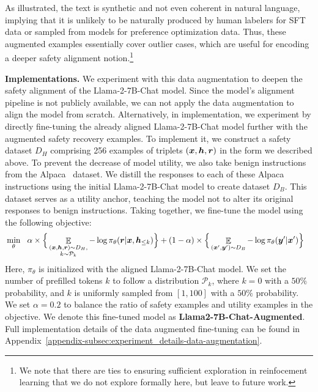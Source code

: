 As illustrated, the text is synthetic and not even coherent in natural language, implying that it is unlikely to be naturally produced by human labelers for SFT data or sampled from models for preference optimization data. Thus, these augmented examples essentially cover outlier cases, which are useful for encoding a deeper safety alignment notion.\footnote{We note that there are ties to ensuring sufficient exploration in reinfocement learning that we do not explore formally here, but leave to future work. }



\textbf{Implementations.} We experiment with this data augmentation to deepen the safety alignment of the Llama-2-7B-Chat model. Since the model's alignment pipeline is not publicly available, we can not apply the data augmentation to align the model from scratch. Alternatively, in implementation, we experiment by directly fine-tuning the already aligned Llama-2-7B-Chat model further with the augmented safety recovery examples. To implement it, we construct a safety dataset $D_H$ comprising 256 examples of triplets $(\bm{x}, \bm{h}, \bm{r})$ in the form we described above. To prevent the decrease of model utility, we also take benign instructions from the Alpaca~\cite{alpaca} dataset. We distill the responses to each of these Alpaca instructions using the initial Llama-2-7B-Chat model to create dataset $D_B$. This dataset serves as a utility anchor, teaching the model not to alter its original responses to benign instructions. Taking together, we fine-tune the model using the following objective:
\begin{align}
  & \min_{\theta} \ \  \alpha \times \Big\{ \mathop{\mathbb{E}}_{\substack{(\bm{x},\bm{h}, \bm{r}) \sim D_H, \\ k \sim \mathcal{P}_k}} - \log \pi_{\theta}(\bm{r}|\bm{x}, \bm{h}_{\le k}) \Big\} +  (1-\alpha) \times \Big\{ \mathop{\mathbb{E}}_{(\bm{x}',\bm{y}') \sim D_B} - \log \pi_{\theta}(\bm{y}'|\bm{x}') \Big\}
\label{eqn:data-augmentation-objective}
\end{align}
Here, $\pi_{\theta}$ is initialized with the aligned Llama-2-7B-Chat model. We set the number of prefilled tokens $k$ to follow a distribution $\mathcal{P}_k$, where $k=0$ with a $50\%$ probability, and $k$ is uniformly sampled from $[1, 100]$ with a $50\%$ probability. We set $\alpha = 0.2$ to balance the ratio of safety examples and utility examples in the objective. %
We denote this fine-tuned model as \textbf{Llama2-7B-Chat-Augmented}. Full implementation details of the data augmented fine-tuning can be found in Appendix~\ref{appendix-subsec:experiment_details-data-augmentation}.


